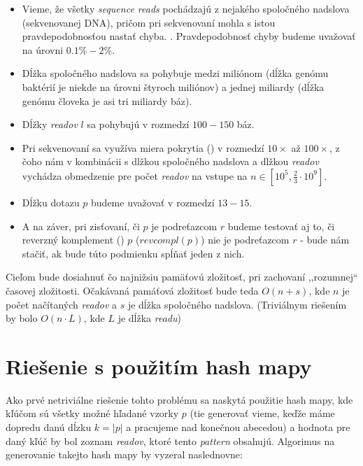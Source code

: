 \begin{itemize}
    \item Vieme, že všetky \emph{sequence reads} pochádzajú z nejakého
    spoločného nadslova (sekvenovanej DNA), pričom pri sekvenovaní mohla s
    istou pravdepodobnosťou nastať chyba. . Pravdepodobnosť chyby budeme uvažovať na úrovni $0.1\% - 2\% $.
    \item Dĺžka spoločného nadslova sa pohybuje medzi miliónom (dĺžka
    genómu baktérií je niekde na úrovni štyroch miliónov) a jednej
    miliardy (dĺžka genómu človeka je asi tri miliardy báz).
    \item Dĺžky \emph{readov} $l$ sa pohybujú v rozmedzí $100 - 150$ báz.
    \item Pri sekvenovaní sa využíva miera pokrytia () v rozmedzí $10\times$ až $100\times$, z čoho nám v
    kombinácii s dlžkou spoločného nadslova a dlžkou \emph{readov} vychádza
    obmedzenie pre počet \emph{readov} na vstupe na 
    $n \in [ 10^5, \frac{2}{3} \cdot 10^9 ]$.
    \item Dĺžku dotazu $p$ budeme uvažovať v rozmedzí $13 -15$. 
    \item A na záver, pri zisťovaní, či $p$ je podreťazcom $r$ budeme testovať
    aj to, či reverzný komplement () $p$ ($revcompl(p)$) nie je podreťazcom $r$ - bude nám stačiť,
    ak bude túto podmienku spĺňať jeden z nich. 
\end{itemize}

Cieľom bude dosiahnuť čo najnižsiu pamäťovú zložitosť, pri zachovaní
,,rozumnej`` časovej zložitosti. Očakávaná pamáťová zložitosť bude teda $O(n +
s)$, kde $n$ je počet načítaných \emph{readov} a $s$ je dĺžka spoločného
nadslova. (Triviálnym riešením by bolo $O(n \cdot L)$, kde $L$ je dĺžka
\emph{readu})

\section{Riešenie s použitím hash mapy}
Ako prvé netriviálne riešenie tohto problému sa naskytá použitie hash mapy,
kde kľúčom sú všetky možné hľadané vzorky $p$ (tie generovať vieme,
keďže máme dopredu danú dĺzku $k = |p|$ a pracujeme nad konečnou abecedou) a
hodnota pre daný kľúč by bol zoznam \emph{readov}, ktoré tento \emph{pattern}
obsahujú. Algorimus na generovanie takejto hash mapy by vyzeral naslednovne:

